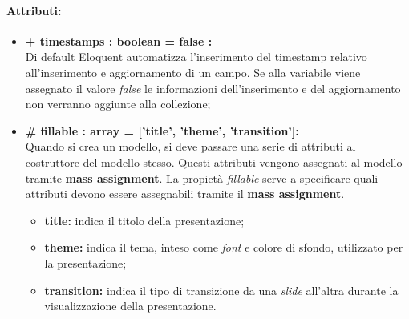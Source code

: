 	\paragraph{Attributi:}
	\begin{itemize}
		\item \textbf{+ timestamps : boolean = false :}\\
		Di default Eloquent automatizza l'inserimento del timestamp relativo all'inserimento e aggiornamento di un campo. Se alla variabile viene assegnato il valore \textit{false} le informazioni dell'inserimento e del aggiornamento non verranno aggiunte alla collezione;
		\item \textbf{\# fillable : array = ['title', 'theme', 'transition']:}\\
		Quando si crea un modello, si deve passare una serie di attributi al costruttore del modello stesso. Questi attributi vengono assegnati al modello tramite \textbf{mass assignment}. La propietà \textit{fillable} serve a specificare quali attributi devono essere assegnabili tramite il \textbf{mass assignment}.
		\begin{itemize}
			\item \textbf{title:} indica il titolo della presentazione;
			\item \textbf{theme:} indica il tema, inteso come \textit{\gls{font}} e colore di sfondo, utilizzato per la presentazione;
			\item \textbf{transition:} indica il tipo di transizione da una \textit{\gls{slide}} all'altra durante la visualizzazione della presentazione.
		\end{itemize}
	\end{itemize}

